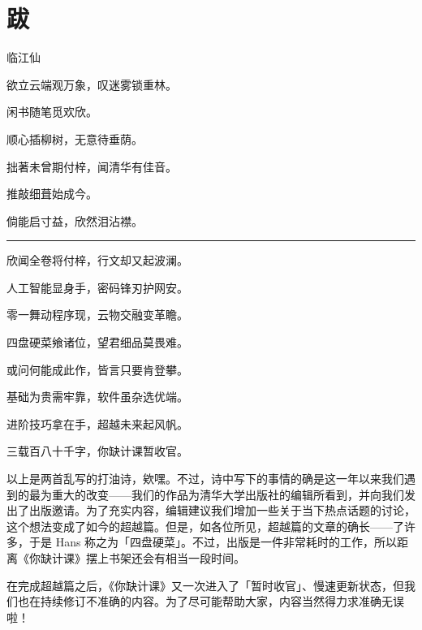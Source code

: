 \chapter*{跋}
\label{afterwords}

\begingroup\centering
  {\large 临江仙}\par\vspace*{.5ex}
  欲立云端观万象，叹迷雾锁重林。\par
  闲书随笔觅欢欣。\par
  顺心插柳树，无意待垂荫。\par
  \phantom{1}\par
  拙著未曾期付梓，闻清华有佳音。\par
  推敲细葺始成今。\par
  倘能启寸益，欣然泪沾襟。\par
\endgroup


\begin{center}\rule{0.5\linewidth}{0.5pt}\end{center}

\begin{multicols}{2}
  \centering
  欣闻全卷将付梓，行文却又起波澜。\par
  人工智能显身手，密码锋刃护网安。\par
  零一舞动程序现，云物交融变革瞻。\par
  四盘硬菜飨诸位，望君细品莫畏难。

  或问何能成此作，皆言只要肯登攀。\par
  基础为贵需牢靠，软件虽杂选优端。\par
  进阶技巧拿在手，超越未来起风帆。\par
  三载百八十千字，你缺计课暂收官。
\end{multicols}

以上是两首乱写的打油诗，欸嘿。不过，诗中写下的事情的确是这一年以来我们遇到的最为重大的改变——我们的作品为清华大学出版社的编辑所看到，并向我们发出了出版邀请。为了充实内容，编辑建议我们增加一些关于当下热点话题的讨论，这个想法变成了如今的超越篇。但是，如各位所见，超越篇的文章的确长——了许多，于是 Hans 称之为「四盘硬菜」。不过，出版是一件非常耗时的工作，所以距离《你缺计课》摆上书架还会有相当一段时间。

在完成超越篇之后，《你缺计课》又一次进入了「暂时收官」、慢速更新状态，但我们也在持续修订不准确的内容。为了尽可能帮助大家，内容当然得力求准确无误啦！

